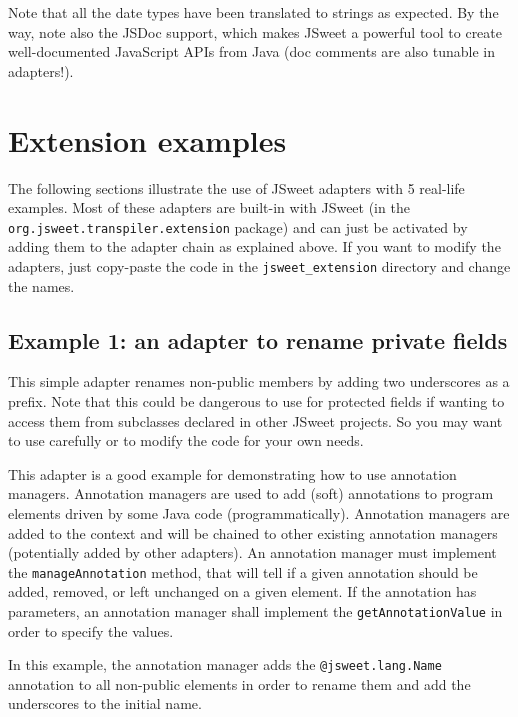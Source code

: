 \documentclass[a4paper]{report}
\begin{document}
Note that all the date types have been translated to strings as expected. By the way, note also the JSDoc support, which makes JSweet a powerful tool to create well-documented JavaScript APIs from Java (doc comments are also tunable in adapters!).

\section{Extension examples}

The following sections illustrate the use of JSweet adapters with 5 real-life examples. Most of these adapters are built-in with JSweet (in the \texttt{org\-.jsweet\-.transpiler\-.extension} package) and can just be activated by adding them to the adapter chain as explained above. If you want to modify the adapters, just copy-paste the code in the \texttt{jsweet\_extension} directory and change the names.

\subsection{Example 1: an adapter to rename private fields}

This simple adapter renames non-public members by adding two underscores as a prefix.
Note that this could be dangerous to use for protected fields if wanting to access them from subclasses declared in other JSweet projects. So you may want to use carefully or to modify the code for your own needs.

This adapter is a good example for demonstrating how to use annotation managers. Annotation managers are used to add (soft) annotations to program elements driven by some Java code (programmatically). Annotation managers are added to the context and will be chained to other existing annotation managers (potentially added by other adapters). An annotation manager must implement the  \texttt{manageAnnotation} method, that will tell if a given annotation should be added, removed, or left unchanged on a given element. If the annotation has parameters, an annotation manager shall implement the \texttt{getAnnotationValue} in order to specify the values.

In this example, the annotation manager adds the \texttt{@jsweet.lang.Name} annotation to all non-public elements in order to rename them and add the underscores to the initial name.
\end{document}
